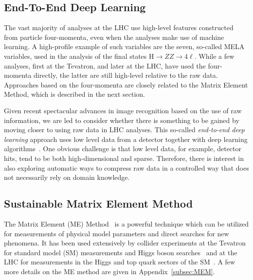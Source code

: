 \subsection{End-To-End Deep Learning}\label{subsec:endtoend}
\label{sec:applications-e2e}
The vast majority of analyses at the LHC use high-level features constructed from particle four-momenta, even when the analyses make use of machine learning. A high-profile example of such variables are the seven, so-called MELA variables, used in the analysis of the final states $\textrm{H} \rightarrow ZZ \rightarrow 4\ell$. While a few analyses, first at the Tevatron, and later at the LHC, have used the four-momenta directly, the latter are still high-level relative to the raw data. Approaches based on the four-momenta are closely related to the Matrix Element Method, which is described in the next section.

Given recent spectacular advances in image recognition based on the use of raw information, we are led to consider whether there is something to be gained by moving closer to using raw data in LHC analyses. This so-called \emph{end-to-end deep learning} approach uses low level data from a detector together with deep learning algorithms~\cite{Andrews:2018nwy,Andrews:2019faz}. One obvious challenge is that low level data, for example, detector hits, tend to be both high-dimensional and sparse.
Therefore, there is interest in also exploring automatic ways to compress raw data in a controlled way that does not necessarily rely on domain knowledge.


\subsection{Sustainable Matrix Element Method}
\label{sec:applications-MEM}


The Matrix Element (ME) Method~\cite{Kondo:1988yd,Fiedler:2010sg,2011arXiv1101.2259V,Elahi:2017ppe} is a powerful technique which can be utilized for measurements of physical model parameters and direct searches for new phenomena.
It has been used extensively by collider experiments at the Tevatron for standard model (SM) measurements and Higgs boson searches~\cite{Abazov:2004cs,Abulencia:2006ry,Aaltonen:2008mv,Aaltonen:2010cm,Abazov:2009ii,Aaltonen:2009jj} and at the LHC for measurements in the Higgs and top quark sectors of the SM~\cite{Chatrchyan:2012xdj,Chatrchyan:2013mxa,Aad:2014eva,Khachatryan:2015tzo, Khachatryan:2015ila,Aad:2015gra,Aad:2015upn}. A few more details on the ME method are given in Appendix~\ref{subsec:MEM}.

